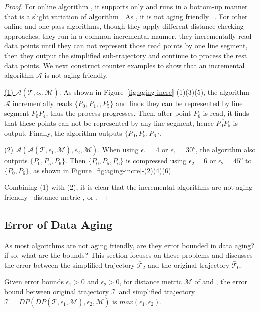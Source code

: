 \begin{proof}
	For online algorithm \squishe, it supports \sed only and runs in a bottom-up manner that is a slight variation of algorithm \tpa. As \tpa, it is not aging friendly \wrt~\sed.
	For other online and one-pass algorithms, though they apply different distance checking approaches, they run in a common incremental manner, \ie they incrementally read data points until they can not represent those read points by one line segment, then they output the simplified sub-trajectory and continue to process the rest data points. We next construct counter examples to show that an incremental algorithm $\mathcal{A}$ is not aging friendly.
	
	\underline{(1) ${\mathcal{A}}(\dddot{\mathcal{T}}, \epsilon_2, \mathcal{M})$}. As shown in Figure~\ref{fig:aging-incre}-(1)(3)(5), the algorithm $\mathcal{A}$ incrementally reads $\{P_0, P_1,\dddot, P_5\}$ and finds they can be represented by line segment $\overline{P_0P_4}$, thus the process progresses. Then, after point $P_6$ is read, it finds that these points can not be represented by any line segment, hence $\overline{P_0P_5}$ is output. Finally, the algorithm outputs $\{P_0, P_5, P_6\}$.
	
	\underline{(2) ${\mathcal{A}}(\mathcal{A}(\dddot{\mathcal{T}}, \epsilon_1, \mathcal{M}), \epsilon_2, \mathcal{M})$}. When using $\epsilon_1=4$ or $\epsilon_1=30^o $, the algorithm also outputs $\{P_0, P_5, P_6\}$. Then $\{P_0, P_5, P_6\}$ is compressed using $\epsilon_2=6$ or $\epsilon_2=45^o$ to $\{P_0, P_6\}$, as shown in Figure~\ref{fig:aging-incre}-(2)(4)(6).
	
	Combining (1) with (2), it is clear that the incremental algorithms are not aging friendly \wrt~distance metric \ped, \sed or \dad.
\end{proof}



\subsection{Error of Data Aging}
As most algorithms are not aging friendly, are they error bounded in data aging?
if so, what are the bounds?
This section focuses on these problems and discusses the error between the simplified trajectory $\overline{\mathcal{T}}_2$ and the original trajectory $\dddot{\mathcal{T}_0}$.

\begin{proposition}
	\label{theo-aging-error-dp}
	Given error bounds $\epsilon_1>0$ and $\epsilon_2>0$, for distance metric $\mathcal{M}$ of \ped and \sed, the error bound between original trajectory $\dddot{\mathcal{T}}$ and simplified trajectory $\overline{\mathcal{T}}=DP(DP(\dddot{\mathcal{T}}, \epsilon_1, \mathcal{M}), \epsilon_2, \mathcal{M})$ is $max(\epsilon_1, \epsilon_2)$.
\end{proposition}

